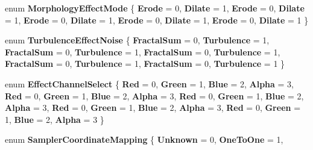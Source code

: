 \begin{DoxyCompactItemize}
enum {\bfseries Morphology\+Effect\+Mode} \{ \newline
{\bfseries Erode} = 0, 
{\bfseries Dilate} = 1, 
{\bfseries Erode} = 0, 
{\bfseries Dilate} = 1, 
\newline
{\bfseries Erode} = 0, 
{\bfseries Dilate} = 1, 
{\bfseries Erode} = 0, 
{\bfseries Dilate} = 1, 
\newline
{\bfseries Erode} = 0, 
{\bfseries Dilate} = 1
 \}
\item 
\mbox{\label{namespace_microsoft_1_1_graphics_1_1_canvas_1_1_effects_a57ff6492fca7c9d4ed49c3588ec24c76}} 
enum {\bfseries Turbulence\+Effect\+Noise} \{ \newline
{\bfseries Fractal\+Sum} = 0, 
{\bfseries Turbulence} = 1, 
{\bfseries Fractal\+Sum} = 0, 
{\bfseries Turbulence} = 1, 
\newline
{\bfseries Fractal\+Sum} = 0, 
{\bfseries Turbulence} = 1, 
{\bfseries Fractal\+Sum} = 0, 
{\bfseries Turbulence} = 1, 
\newline
{\bfseries Fractal\+Sum} = 0, 
{\bfseries Turbulence} = 1
 \}
\item 
\mbox{\label{namespace_microsoft_1_1_graphics_1_1_canvas_1_1_effects_aa548de5fcafa34088d6dfff1bf77df8b}} 
enum {\bfseries Effect\+Channel\+Select} \{ \newline
{\bfseries Red} = 0, 
{\bfseries Green} = 1, 
{\bfseries Blue} = 2, 
{\bfseries Alpha} = 3, 
\newline
{\bfseries Red} = 0, 
{\bfseries Green} = 1, 
{\bfseries Blue} = 2, 
{\bfseries Alpha} = 3, 
\newline
{\bfseries Red} = 0, 
{\bfseries Green} = 1, 
{\bfseries Blue} = 2, 
{\bfseries Alpha} = 3, 
\newline
{\bfseries Red} = 0, 
{\bfseries Green} = 1, 
{\bfseries Blue} = 2, 
{\bfseries Alpha} = 3, 
\newline
{\bfseries Red} = 0, 
{\bfseries Green} = 1, 
{\bfseries Blue} = 2, 
{\bfseries Alpha} = 3
 \}
\item 
\mbox{\label{namespace_microsoft_1_1_graphics_1_1_canvas_1_1_effects_aee19f17bf119d8ef07f460eb2da92efe}} 
enum {\bfseries Sampler\+Coordinate\+Mapping} \{ \newline
{\bfseries Unknown} = 0, 
{\bfseries One\+To\+One} = 1, 

\end{DoxyCompactItemize}
